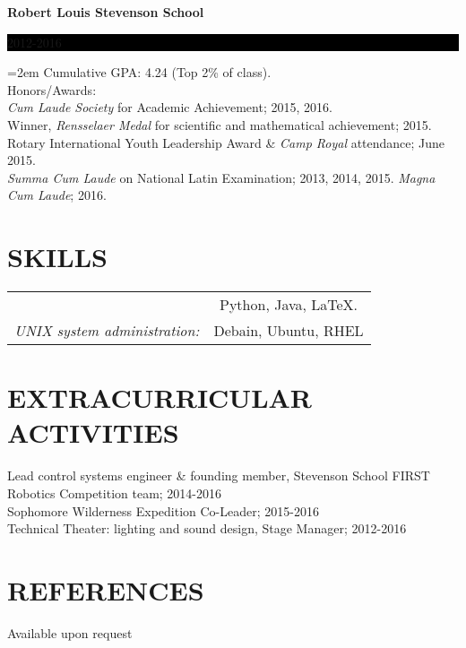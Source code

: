 \documentclass[paper=a4,fontsize=11pt]{scrartcl} %
\newlength{\spacebox}
\newcommand{\NewPart}[1]{\section*{\uppercase{#1}}}
\newcommand{\PersonalEntry}[2]{
		\noindent\hangindent=2em\hangafter=0 %
		\parbox{\spacebox}{        %
		\textit{#1}}		       %
		\hspace{1.5em} #2 \par}    %
\newcommand{\SkillsEntry}[2]{      %
		\noindent\hangindent=2em\hangafter=0 %
		\parbox{\spacebox}{        %
		\textit{#1}}			   %
		\hspace{1.5em} #2 \par}    %
\newcommand{\EducationEntryNoSubtitle}[3]{
	\noindent \textbf{#1} \hfill      %
	\colorbox{Black}{%
		\parbox{6em}{%
			\hfill\color{White}#2}} \par %
	\noindent\hangindent=2em\hangafter=0 \small #3 %
	\normalsize \par}
\begin{document}
\EducationEntryNoSubtitle{Robert Louis Stevenson School}{2012-2016}{Cumulative GPA: 4.24 (Top 2\% of class).\\Honors/Awards:\\
		\indent\textit{Cum Laude Society} for Academic Achievement; 2015, 2016.\\
		\indent Winner, \textit{Rensselaer Medal} for scientific and mathematical achievement; 2015.\\
		\indent Rotary International Youth Leadership Award \& \textit{Camp Royal} attendance; June 2015.\\
		\indent \textit{Summa Cum Laude} on National Latin Examination; 2013, 2014, 2015. \textit{Magna Cum Laude}; 2016.
	}
	
	


\NewPart{Skills}{}
\begin{tabular}{cc}
\textit{\raggedright{Programming:}} & Python, Java, \LaTeX.\\
\textit{UNIX system administration:} & Debain, Ubuntu, RHEL\\
\end{tabular}

\NewPart{Extracurricular Activities}{}
Lead control systems engineer \& founding member, Stevenson School FIRST Robotics Competition team; 2014-2016\\
Sophomore Wilderness Expedition Co-Leader; 2015-2016\\
Technical Theater: lighting and sound design, Stage Manager; 2012-2016

\NewPart{References}{}
Available upon request
\end{document}
